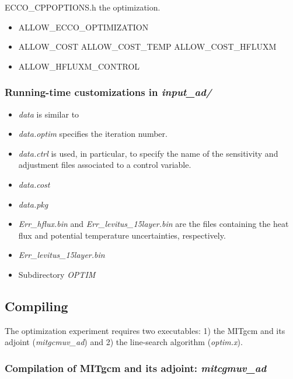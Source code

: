 ECCO_CPPOPTIONS.h the optimization.

\begin{itemize}
\item ALLOW\_ECCO\_OPTIMIZATION

\item ALLOW\_COST ALLOW\_COST\_TEMP ALLOW\_COST\_HFLUXM

\item ALLOW\_HFLUXM\_CONTROL
\end{itemize}

\subsubsection{Running-time customizations in {\it input\_ad/}}

\begin{itemize}

\item {\it data} is similar to 

\item {\it data.optim} specifies the iteration number.

\item {\it data.ctrl} is used, in particular, to specify the
name of the sensitivity and adjustment files associated to a control
variable.

\item {\it data.cost} 

\item {\it data.pkg}

\item {\it Err\_hflux.bin} and {\it Err\_levitus\_15layer.bin} are the
files containing the heat flux and potential temperature uncertainties,
respectively.

\item {\it Err\_levitus\_15layer.bin}

\item Subdirectory {\it OPTIM}

\end{itemize}

\subsection{Compiling} 

The optimization experiment requires two executables: 1) the 
MITgcm and its adjoint ({\it mitgcmuv\_ad}) and 2) the line-search
algorithm ({\it optim.x}).

\subsubsection{Compilation of MITgcm and its adjoint: {\it mitcgmuv\_ad}}

